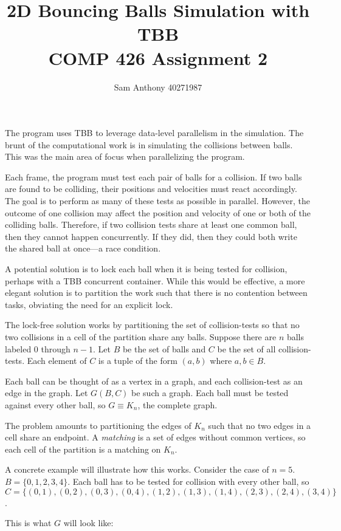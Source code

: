 \documentclass[11pt]{article}
\title{2D Bouncing Balls Simulation with TBB\\
\large COMP 426 Assignment 2}
\author{Sam Anthony 40271987}
\begin{document}
\maketitle

The program uses TBB to leverage data-level parallelism in the simulation.
The brunt of the computational work is in simulating the collisions between balls.
This was the main area of focus when parallelizing the program.

Each frame, the program must test each pair of balls for a collision.
If two balls are found to be colliding, their positions and velocities must react accordingly.
The goal is to perform as many of these tests as possible in parallel.
However, the outcome of one collision may affect the position and velocity of one or both of the colliding balls.
Therefore, if two collision tests share at least one common ball, then they cannot happen concurrently.
If they did, then they could both write the shared ball at once---a race condition.

A potential solution is to lock each ball when it is being tested for collision, perhaps with a TBB concurrent container.
While this would be effective, a more elegant solution is to partition the work such that there is no contention between tasks, obviating the need for an explicit lock.

The lock-free solution works by partitioning the set of collision-tests so that no two collisions in a cell of the partition share any balls.
Suppose there are $n$ balls labeled 0 through $n-1$.
Let $B$ be the set of balls and $C$ be the set of all collision-tests.
Each element of $C$ is a tuple of the form $(a, b)$ where $a,b \in B$.

Each ball can be thought of as a vertex in a graph, and each collision-test as an edge in the graph.
Let $G(B, C)$ be such a graph.
Each ball must be tested against every other ball, so $G \equiv K_n$, the complete graph.

The problem amounts to partitioning the edges of $K_n$ such that no two edges in a cell share an endpoint.
A \emph{matching} is a set of edges without common vertices, so each cell of the partition is a matching on $K_n$.

A concrete example will illustrate how this works.
Consider the case of $n = 5$.
$B = \{0, 1, 2, 3, 4\}$.
Each ball has to be tested for collision with every other ball, so $C = \{(0, 1), (0, 2), (0, 3), (0, 4), (1, 2), (1, 3), (1, 4), (2, 3), (2, 4), (3, 4)\}$.

This is what $G$ will look like:
\end{document}
